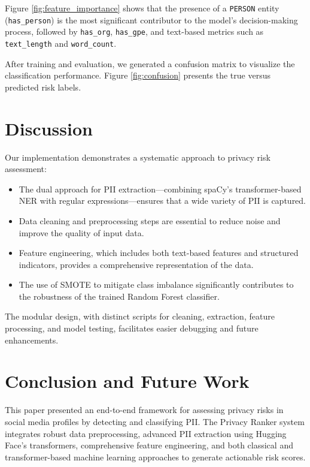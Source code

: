 \documentclass{article}
\begin{document}
Figure \ref{fig:feature_importance} shows that the presence of a \texttt{PERSON} entity (\texttt{has\_person}) is the most significant contributor to the model’s decision-making process, followed by \texttt{has\_org}, \texttt{has\_gpe}, and text-based metrics such as \texttt{text\_length} and \texttt{word\_count}.

After training and evaluation, we generated a confusion matrix to visualize the classification performance. Figure \ref{fig:confusion} presents the true versus predicted risk labels.

\section{Discussion}
Our implementation demonstrates a systematic approach to privacy risk assessment:
\begin{itemize}
    \item The dual approach for PII extraction—combining spaCy's transformer-based NER with regular expressions—ensures that a wide variety of PII is captured.
    \item Data cleaning and preprocessing steps are essential to reduce noise and improve the quality of input data.
    \item Feature engineering, which includes both text-based features and structured indicators, provides a comprehensive representation of the data.
    \item The use of SMOTE to mitigate class imbalance significantly contributes to the robustness of the trained Random Forest classifier.
\end{itemize}
The modular design, with distinct scripts for cleaning, extraction, feature processing, and model testing, facilitates easier debugging and future enhancements.

\section{Conclusion and Future Work}
This paper presented an end-to-end framework for assessing privacy risks in social media profiles by detecting and classifying PII. The Privacy Ranker system integrates robust data preprocessing, advanced PII extraction using Hugging Face’s transformers, comprehensive feature engineering, and both classical and transformer-based machine learning approaches to generate actionable risk scores.
\end{document}
